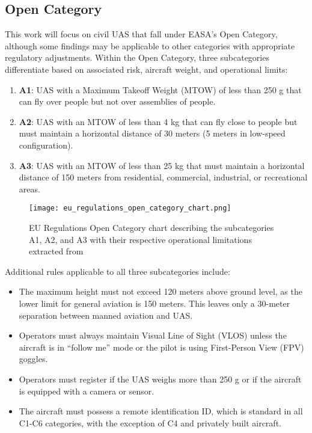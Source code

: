 \subsection{Open Category}
This work will focus on civil UAS that fall under EASA's Open Category, although some findings may be applicable to other categories with appropriate regulatory adjustments. Within the Open Category, three subcategories differentiate based on associated risk, aircraft weight, and operational limits:

\begin{enumerate}
  \item \textbf{A1}: UAS with a Maximum Takeoff Weight (MTOW) of less than 250 g that can fly over people but not over assemblies of people.

  \item \textbf{A2}: UAS with an MTOW of less than 4 kg that can fly close to people but must maintain a horizontal distance of 30 meters (5 meters in low-speed configuration).

  \item \textbf{A3}: UAS with an MTOW of less than 25 kg that must maintain a horizontal distance of 150 meters from residential, commercial, industrial, or recreational areas.
\end{enumerate}

\begin{figure}
  \texttt{[image: eu\_regulations\_open\_category\_chart.png]}
  \label{fig:eu_regulations_open_category_chart}
  \caption{EU Regulations Open Category chart describing the subcategories A1, A2, and A3 with their respective operational limitations extracted from \autocite{ageagleEuropeanUnion}}
\end{figure}

Additional rules applicable to all three subcategories include:

\begin{itemize}
  \item The maximum height must not exceed 120 meters above ground level, as the lower limit for general aviation is 150 meters. This leaves only a 30-meter separation between manned aviation and UAS.

  \item Operators must always maintain Visual Line of Sight (VLOS) unless the aircraft is in ``follow me'' mode or the pilot is using First-Person View (FPV) goggles.

  \item Operators must register if the UAS weighs more than 250 g or if the aircraft is equipped with a camera or sensor.

  \item The aircraft must possess a remote identification ID, which is standard in all C1-C6 categories, with the exception of C4 and privately built aircraft.
\end{itemize}
